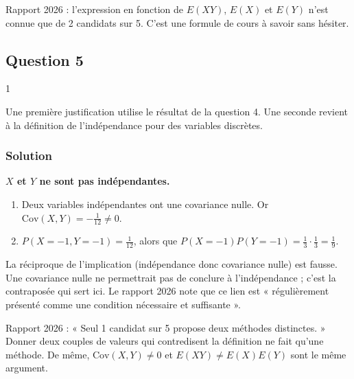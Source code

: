 \documentclass[11pt,a4paper]{article}
\providecommand{\tightlist}{\setlength{\itemsep}{0pt}\setlength{\parskip}{0pt}}
\newcommand{\equationajustee}[1]{%
  \sbox{\boiteequation}{$\displaystyle #1$}%
  \ifdim\wd\boiteequation>\linewidth
    \[\resizebox{\linewidth}{!}{\usebox{\boiteequation}}\]%
  \else
    \[#1\]%
  \fi}
\begin{document}
\equationajustee{\boxed{\mathrm{Cov}(X,Y)=-\tfrac1{12}}}

\begin{jury}

Rapport 2026 : l'expression en fonction de \(E(XY)\), \(E(X)\) et \(E(Y)\) n'est connue que de 2 candidats sur 5. C'est une formule de cours à savoir sans hésiter.

\end{jury}

\hypertarget{question-5-1}{%
\subsection{Question 5}\label{question-5-1}}

\begin{indication}{1}

Une première justification utilise le résultat de la question 4. Une seconde revient à la définition de l'indépendance pour des variables discrètes.

\end{indication}

\hypertarget{solution-15}{%
\subsubsection{Solution}\label{solution-15}}

\textbf{\(X\) et \(Y\) ne sont pas indépendantes.}

\begin{enumerate}
\def\labelenumi{\arabic{enumi}.}
\tightlist
\item
  Deux variables indépendantes ont une covariance nulle. Or \(\mathrm{Cov}(X,Y)=-\frac1{12}\neq0\).
\item
  \(P(X=-1,Y=-1)=\frac1{12}\), alors que \(P(X=-1)P(Y=-1)=\frac13\cdot\frac13=\frac19\).
\end{enumerate}

\begin{piege}

La réciproque de l'implication (indépendance donc covariance nulle) est fausse. Une covariance nulle ne permettrait pas de conclure à l'indépendance ; c'est la contraposée qui sert ici. Le rapport 2026 note que ce lien est « régulièrement présenté comme une condition nécessaire et suffisante ».

\end{piege}

\begin{jury}

Rapport 2026 : « Seul 1 candidat sur 5 propose deux méthodes distinctes. » Donner deux couples de valeurs qui contredisent la définition ne fait qu'une méthode. De même, \(\mathrm{Cov}(X,Y)\neq0\) et \(E(XY)\neq E(X)E(Y)\) sont le même argument.

\end{jury}
\end{document}
